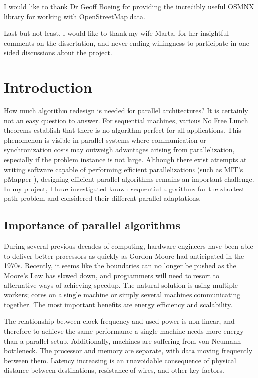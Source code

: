 \documentclass[12pt,a4paper,twoside,openright]{report}
\begin{document}
I would like to thank Dr Geoff Boeing for providing the incredibly useful OSMNX library for working with OpenStreetMap data\cite{Boeing2017}.

Last but not least, I would like to thank my wife Marta, for her insightful comments on the dissertation, and never-ending willingness to participate in one-sided discussions about the project.

\tableofcontents

\pagestyle{headings}
\chapter{Introduction}
How much algorithm redesign is needed for parallel architectures? It is certainly not an easy question to answer. For sequential machines, various No Free Lunch theorems \cite{free-lunch} establish that there is no algorithm perfect for all applications. This phenomenon is  visible in parallel systems where communication or synchronization costs may outweigh advantages arising from parallelization, especially if the problem instance is not large. Although there exist attempts at writing software capable of performing efficient parallelizations (such as MIT's pMapper \cite{pmapper}), designing efficient parallel algorithms remains an important challenge. In my project, I have investigated known sequential algorithms for the shortest path problem and considered their different parallel adaptations.
\section{Importance of parallel algorithms}
During several previous decades of computing, hardware engineers have been able to deliver better processors as quickly as Gordon Moore had anticipated in the 1970s. Recently, it seems like the boundaries can no longer be pushed as the Moore's Law has slowed down\cite{moore-law}, and programmers will need to resort to alternative ways of achieving speedup. The natural solution is using multiple workers; cores on a single machine or simply several machines communicating together. The most important benefits are energy efficiency and scalability. 

The relationship between clock frequency and used power is non-linear, and therefore to achieve the same performance a single machine needs more energy than a parallel setup. Additionally, machines are suffering from von Neumann bottleneck. The processor and memory are separate, with data moving frequently between them. Latency increasing is an unavoidable consequence of physical distance between destinations, resistance of wires, and other key factors. 
\end{document}
